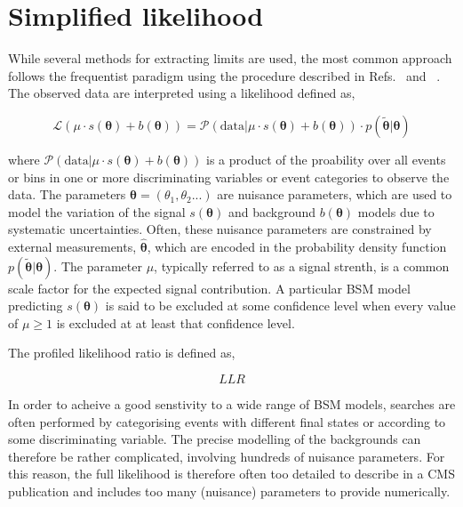 \section{Simplified likelihood}
\label{sec:simplified-likelihood}

While several methods for extracting 
limits are used, the most common approach follows the frequentist paradigm using the procedure 
described in Refs.~\cite{} and ~\cite{}. 
The observed data are interpreted using a likelihood defined as,

\begin{equation}
 \mathcal{L}(\mu\cdot s(\boldsymbol{\theta}) + b(\boldsymbol{\theta})) = 
 \mathcal{P}(\mathrm{data}|\mu\cdot s(\boldsymbol{\theta}) + b(\boldsymbol{\theta})) \cdot p(\tilde{\boldsymbol{\theta}}|\boldsymbol{\theta})
\label{eq:generic-likelihood}
\end{equation}

where $\mathcal{P}(\mathrm{data}|\mu\cdot s(\boldsymbol{\theta}) + b(\boldsymbol{\theta}))$ is a product of the proability 
over all events or bins in one or more discriminating variables or event categories to observe the data. The parameters 
$\boldsymbol{\theta}=\left(\theta_{1},\theta_{2}...\right)$ are nuisance parameters, which are used to model the variation of the 
signal $s(\boldsymbol{\theta})$ and background $b(\boldsymbol{\theta})$ models due to systematic uncertainties. Often, these nuisance 
parameters are constrained by external measurements, $\hat{\boldsymbol{\theta}}$, which are encoded in the 
probability density function $p(\tilde{\boldsymbol{\theta}}|\boldsymbol{\theta})$. 
The parameter $\mu$, typically referred to as a signal strenth, is a common scale factor for the expected signal contribution. 
A particular BSM model predicting $s(\boldsymbol{\theta})$ is said to be excluded at some confidence level 
when every value of $\mu\ge1$ is excluded at at least that confidence level.

The profiled likelihood ratio is defined as,

\begin{equation}
LLR
\label{eq:generic-likelihood}
\end{equation}


In order to acheive a good senstivity to a wide range of BSM models, searches are often performed 
by categorising events with different final states or according to some discriminating variable. 
The precise modelling of the backgrounds can therefore be rather complicated, involving hundreds 
of nuisance parameters. For this reason, the full likelihood is therefore often 
too detailed to describe in a CMS publication and includes too many (nuisance) parameters to provide numerically.

